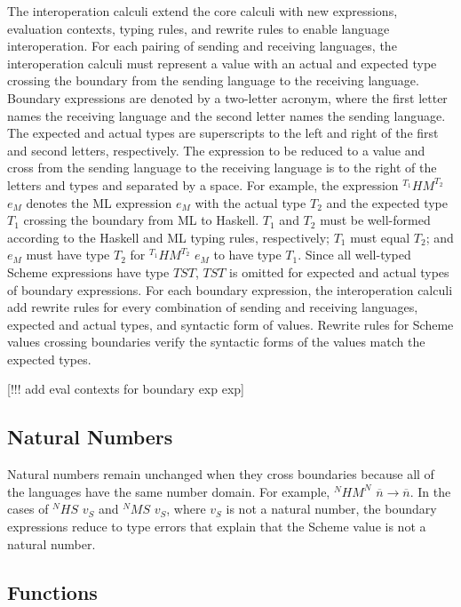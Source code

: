 The interoperation calculi extend the core calculi with new expressions, evaluation contexts, typing rules, and rewrite rules to enable language interoperation.  For each pairing of sending and receiving languages, the interoperation calculi must represent a value with an actual and expected type crossing the boundary from the sending language to the receiving language.  Boundary expressions are denoted by a two-letter acronym, where the first letter names the receiving language and the second letter names the sending language.  The expected and actual types are superscripts to the left and right of the first and second letters, respectively.  The expression to be reduced to a value and cross from the sending language to the receiving language is to the right of the letters and types and separated by a space.  For example, the expression $^{T_{1}}HM^{T_{2}}$ $e_{M}$ denotes the ML expression $e_{M}$ with the actual type $T_{2}$ and the expected type $T_{1}$ crossing the boundary from ML to Haskell.  $T_{1}$ and $T_{2}$ must be well-formed according to the Haskell and ML typing rules, respectively; $T_{1}$ must equal $T_{2}$; and $e_{M}$ must have type $T_{2}$ for $^{T_{1}}HM^{T_{2}}$ $e_{M}$ to have type $T_{1}$.  Since all well-typed Scheme expressions have type $TST$, $TST$ is omitted for expected and actual types of boundary expressions.  For each boundary expression, the interoperation calculi add rewrite rules for every combination of sending and receiving languages, expected and actual types, and syntactic form of values.  Rewrite rules for Scheme values crossing boundaries verify the syntactic forms of the values match the expected types.

[!!! add eval contexts for boundary exp exp]

\subsection{Natural Numbers}

Natural numbers remain unchanged when they cross boundaries because all of the languages have the same number domain.  For example, $^{N}HM^{N}$ $\overline{n}\rightarrow\overline{n}$.  In the cases of $^{N}HS$ $v_{S}$ and $^{N}MS$ $v_{S}$, where $v_{S}$ is not a natural number, the boundary expressions reduce to type errors that explain that the Scheme value is not a natural number.

\subsection{Functions}

